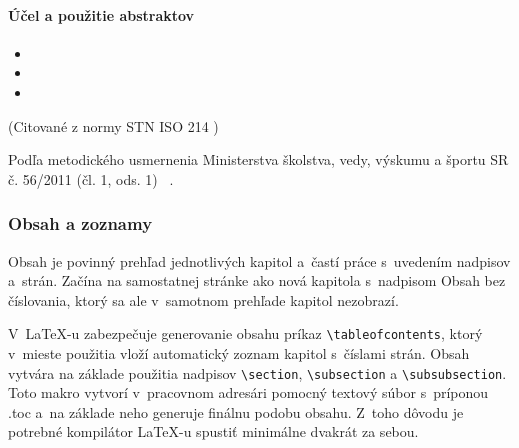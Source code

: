 \paragraph{Účel a použitie abstraktov}
\begin{itemize}\it
  \item {}

  \item {}

  \item {}
\end{itemize}
\begin{flushright}
(Citované z normy STN ISO 214 \cite{iso214})
\end{flushright}

Podľa metodického usmernenia Ministerstva školstva, vedy, výskumu a športu SR č. 56/2011 (čl. 1, ods. 1) 
\emph{}~\cite{usmernenie562011}.

\subsubsection{Obsah a zoznamy}
Obsah je povinný prehľad jednotlivých kapitol
a~častí práce s~uvedením nadpisov a~strán.
Začína na samostatnej stránke ako nová kapitola 
s~nadpisom Obsah bez číslovania,
ktorý sa ale v~samotnom prehľade kapitol nezobrazí.

V~\LaTeX-u zabezpečuje generovanie obsahu príkaz \verb|\tableofcontents|, 
ktorý v~mieste použitia vloží automatický zoznam kapitol s~číslami strán.
Obsah vytvára na základe použitia nadpisov \verb|\section|,
\verb|\subsection| a \verb|\subsubsection|.
Toto makro vytvorí v~pracovnom adresári pomocný textový súbor
s~príponou .toc a~na základe neho generuje finálnu podobu obsahu.
Z~toho dôvodu je potrebné kompilátor \LaTeX-u
spustiť minimálne dvakrát za sebou.

